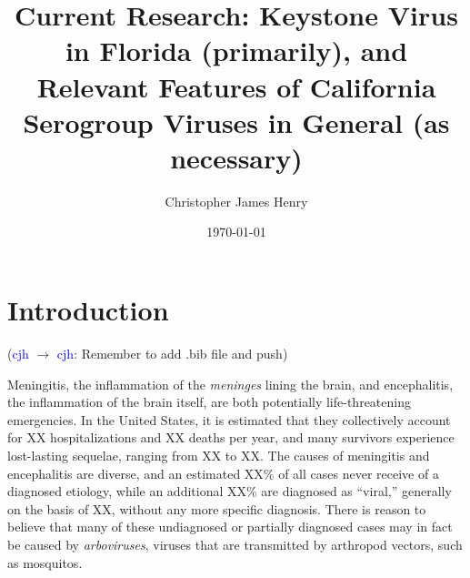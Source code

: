 \documentclass[12pt]{article}
\title%
{Current Research: Keystone Virus in Florida (primarily), and Relevant Features of California Serogroup Viruses in General (as necessary)}
\author%
{Christopher James Henry}
\date{\today}
\newcommand{\cjh}{\textcolor{blue}{cjh}}
\newcommand{\tjh}{\textcolor{red}{tjh}}
\newcommand{\msg}[3]{(#1 $\rightarrow$ #2: #3)}
\newcommand{\mcc}[1]{\msg\cjh\cjh{#1}}
\newcommand{\mtc}[1]{\msg\tjh\cjh{#1}}
\begin{document}
    \titlepage
    


    \section{Introduction}
        \label{intro}

        \mcc{Remember to add .bib file and push}

        Meningitis, the inflammation of the \textit{meninges} lining the brain, and encephalitis, the inflammation of the brain itself, are both potentially life-threatening emergencies. In the United States, it is estimated that they collectively account for XX hospitalizations and XX deaths per year, and many survivors experience lost-lasting sequelae, ranging from XX to XX. The causes of meningitis and encephalitis are diverse, and an estimated XX\% of all cases never receive of a diagnosed etiology, while an additional XX\% are diagnosed as ``viral,'' generally on the basis of XX, without any more specific diagnosis. There is reason to believe that many of these undiagnosed or partially diagnosed cases may in fact be caused by \textit{arboviruses}, viruses that are transmitted by arthropod vectors, such as mosquitos.
\end{document}
